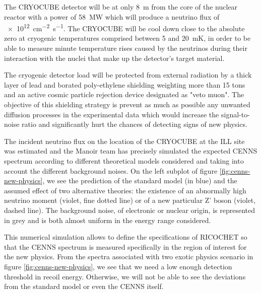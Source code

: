 The CRYOCUBE detector will be at only \SI{8}{\m} from the core of the nuclear reactor with a power of \SI{58}{\mega\watt} which will produce a neutrino flux of \SI{e12}{\cm^{-2} \s^{-1}}. The CRYOCUBE will be cool down close to the absolute zero at cryogenic temperatures comprised between 5 and \SI{20}{\milli\kelvin}, in order to be able to measure minute temperature rises caused by the neutrinos during their interaction with the nuclei that make up the detector's target material.

The cryogenic detector load will be protected from external radiation by a thick layer of lead and borated poly-ethylene shielding weighting more than 15 tons and an active cosmic particle rejection device designated as "veto muon". The objective of this shielding strategy is prevent as much as possible any unwanted diffusion processes in the experimental data which would increase the signal-to-noise ratio and significantly hurt the chances of detecting signs of new physics.

The incident neutrino flux on the location of the CRYOCUBE at the ILL site was estimated and
the Manoir team has precisely simulated the expected CENNS spectrum according to different theoretical models considered and taking into account the different background noises. On the left subplot of figure \ref{fig:cenns-new-physics}, we see the prediction of the standard model (in blue) and the assumed effect of two alternative theories: the existence of an abnormally high neutrino moment (violet, fine dotted line) or of a new particular Z' boson (violet, dashed line). The background noise, of electronic or nuclear origin, is represented in grey and is both almost uniform in the energy range considered.

This numerical simulation allows to define the specifications of RICOCHET so that the CENNS spectrum is measured specifically in the region of interest for the new physics. From the spectra associated with two exotic physics scenario in figure \ref{fig:cenns-new-physics}, we see that we need a low enough detection threshold in recoil energy. Otherwise, we will not be able to see the deviations from the standard model or even the CENNS itself.

